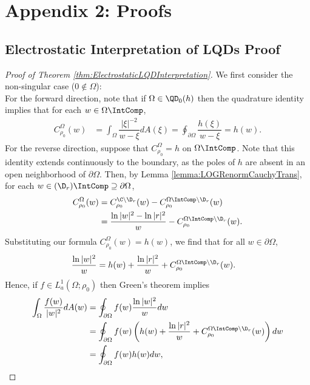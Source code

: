 \documentclass{article}
\numberwithin{equation}{section}
\begin{document}
\section{Appendix 2: Proofs}

\subsection{Electrostatic Interpretation of LQDs Proof}\label{subsection:ElectrostaticLQDInterpretation}


\begin{proof}[Proof of Theorem \ref{thm:ElectrostaticLQDInterpretation}]\label{proof:ElectrostaticLQDInterpretation}
We first consider the non-singular case ($0\notin\Omega$):\\
For the forward direction, note that if $\Omega\in\QD_0(h)$ then the quadrature identity implies that for each $w\in\Omega\IntComp$,
\begin{align*}
    C_{\rho_0}^{\Omega}(w)&=\int_{\Omega}\dfrac{|\xi|^{-2}}{w-\xi}dA(\xi)=\oint_{\partial\Omega}\dfrac{h(\xi)}{w-\xi}=h(w).
\end{align*}
For the reverse direction, suppose that $C_{\rho_0}^{\Omega}=h$ on $\Omega\IntComp$. Note that this identity extends continuously to the boundary, as the poles of $h$ are absent in an open neighborhood of $\partial\Omega$. Then, by Lemma \ref{lemma:LOGRenormCauchyTrans}, for each $w\in(\D_{r})\IntComp\supseteq\partial\Omega$,
\begin{align*}
    C_{\rho_0}^{\Omega}(w)&=C_{\rho_0}^{\C\setminus\D_r}(w)-C_{\rho_0}^{\Omega\IntComp\setminus\D_r}(w)\\
    &=\dfrac{\ln|w|^2-\ln|r|^2}{w}-C_{\rho_0}^{\Omega\IntComp\setminus\D_r}(w).
\end{align*}
Substituting our formula $C_{\rho_0}^{\Omega}(w)=h(w)$, we find that for all $w\in\partial\Omega$,
\begin{align*}
    \dfrac{\ln|w|^2}{w}&=h(w)+\dfrac{\ln|r|^2}{w}+C_{\rho_0}^{\Omega\IntComp\setminus\D_r}(w).
\end{align*}
Hence, if $f\in L_a^1(\Omega;\rho_0)$ then Green's theorem implies
\begin{align*}
    \int_{\Omega}\dfrac{f(w)}{|w|^2}dA(w)&=\oint_{\partial\Omega}f(w)\dfrac{\ln|w|^2}{w}dw\\
    &=\oint_{\partial\Omega}f(w)\left(h(w)+\dfrac{\ln|r|^2}{w}+C_{\rho_0}^{\Omega\IntComp\setminus\D_r}(w)\right)dw\\
    &=\oint_{\partial\Omega}f(w)h(w)dw,
\end{align*}

\end{proof}
\end{document}
